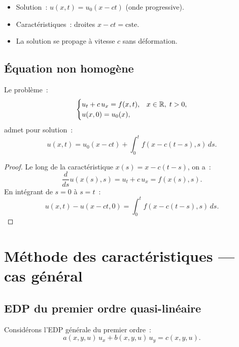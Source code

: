 \begin{formules}[title=\textbf{\'Equation de transport --- formules cl\'es}]
\begin{itemize}
    \item Solution~: $u(x,t) = u_0(x - ct)$ (onde progressive).
    \item Caract\'eristiques~: droites $x - ct = \mathrm{cste}$.
    \item La solution se propage \`a vitesse $c$ sans d\'eformation.
\end{itemize}
\end{formules}

\subsection{\'Equation non homog\`ene}

\begin{theoreme}
Le probl\`eme~:
\begin{equation}\label{eq:transport_source}
    \begin{cases}
        u_t + c\, u_x = f(x,t), & x \in \mathbb{R},\; t > 0,\\
        u(x,0) = u_0(x),
    \end{cases}
\end{equation}
admet pour solution~:
\begin{equation}\label{eq:transport_source_sol}
    u(x,t) = u_0(x-ct) + \int_0^t f(x - c(t-s), s)\, ds.
\end{equation}
\end{theoreme}

\begin{proof}
Le long de la caract\'eristique $x(s) = x - c(t-s)$, on a~:
\[
    \frac{d}{ds}u(x(s),s) = u_t + c\, u_x = f(x(s),s).
\]
En int\'egrant de $s=0$ \`a $s=t$~:
\[
    u(x,t) - u(x-ct, 0) = \int_0^t f(x - c(t-s), s)\, ds.
\]
\end{proof}

\section{M\'ethode des caract\'eristiques --- cas g\'en\'eral}

\subsection{EDP du premier ordre quasi-lin\'eaire}

Consid\'erons l'EDP g\'en\'erale du premier ordre~:
\begin{equation}\label{eq:quasi_lineaire}
    a(x,y,u)\, u_x + b(x,y,u)\, u_y = c(x,y,u).
\end{equation}

